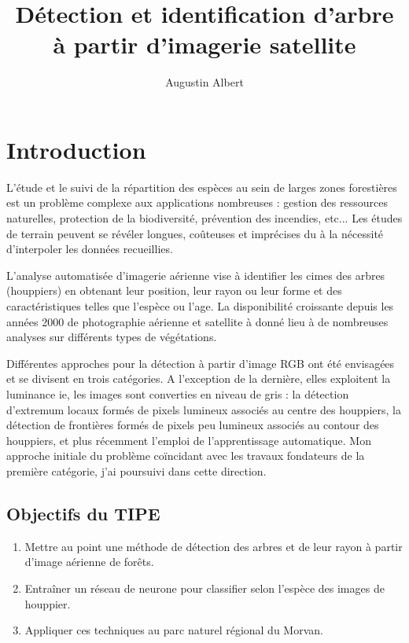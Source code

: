 \documentclass{article}
\title{Détection et identification d'arbre à partir d'imagerie satellite}
\author{Augustin Albert}
\begin{document}

\maketitle
\tableofcontents
\newpage 

\section*{Introduction}

L'étude et le suivi de la répartition des espèces au sein de larges zones forestières est un problème complexe aux applications nombreuses :
gestion des ressources naturelles, protection de la biodiversité, prévention des incendies, etc... Les études de terrain peuvent se révéler longues, coûteuses et imprécises du à la nécessité d'interpoler les données recueillies. 

L'analyse automatisée d'imagerie aérienne vise à identifier les cimes des arbres (houppiers) en obtenant leur position, leur rayon ou leur forme et des caractéristiques telles que l'espèce ou l'age. La disponibilité croissante depuis les années 2000 de photographie aérienne et satellite à donné lieu à de nombreuses analyses sur différents types de végétations.

Différentes approches pour la détection à partir d'image RGB ont été envisagées et se divisent en trois catégories. A l'exception de la dernière, elles exploitent la luminance ie, les images sont converties en niveau de gris : la détection d'extremum locaux formés de pixels lumineux associés au centre des houppiers, la détection de frontières formés de pixels peu lumineux associés au contour des houppiers, et plus récemment l'emploi de l'apprentissage automatique. Mon approche initiale du problème coïncidant avec les travaux fondateurs de la première catégorie, j'ai poursuivi dans cette direction. 

\subsection*{Objectifs du TIPE}		
\begin{enumerate}
	\item Mettre au point une méthode de détection des arbres et de leur rayon à partir d'image aérienne de forêts.  
    \item Entraîner un réseau de neurone pour classifier selon l'espèce des images de houppier.
	\item Appliquer ces techniques au parc naturel régional du Morvan.   
\end{enumerate}
	
\end{document}

